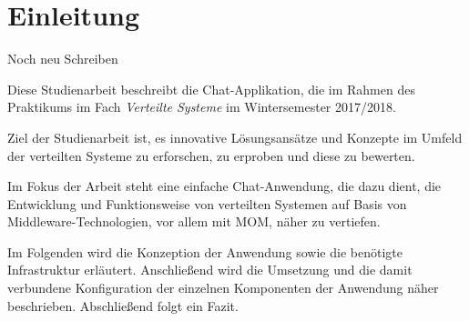 \documentclass[10pt,journal,compsoc]{IEEEtran}
\begin{document}
\section{Einleitung}
\label{sec:Einleitung}
\fi




%
%
%
%
\IEEEPARstart Noch neu Schreiben


{D}{iese} Studienarbeit beschreibt die Chat-Applikation, die im Rahmen des Praktikums im Fach \textit{Verteilte Systeme} im Wintersemester 2017/2018. 

Ziel der Studienarbeit ist, es innovative Lösungsansätze und Konzepte im Umfeld der verteilten Systeme zu erforschen, zu erproben und diese zu bewerten. 

Im Fokus der Arbeit steht eine einfache Chat-Anwendung, die dazu dient, die Entwicklung und Funktionsweise von verteilten Systemen auf Basis von Middleware-Technologien, vor allem mit \ac{MOM}, näher zu vertiefen.

Im Folgenden wird die Konzeption der Anwendung sowie die benötigte Infrastruktur erläutert. Anschließend wird die Umsetzung und die damit verbundene Konfiguration der einzelnen Komponenten der Anwendung näher beschrieben. Abschließend folgt ein Fazit. 
\end{document}
